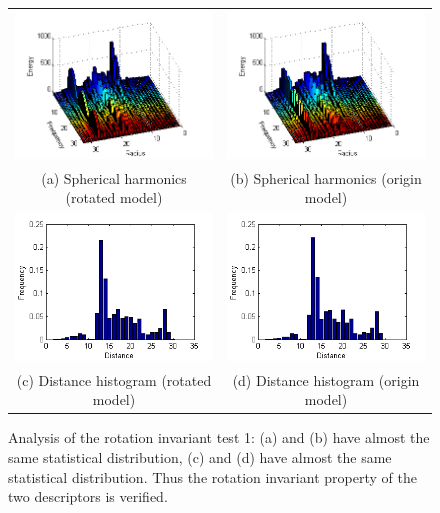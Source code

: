 \begin{figure}
\begin{center}
\begin{tabular}{cc}   %
   \includegraphics[width=0.45\linewidth]{rotationinvariant_test_SH10_rotated} & 
   \includegraphics[width=0.45\linewidth]{rotationinvariant_test_SH10_origin}  \\
   (a) Spherical harmonics (rotated model) & (b) Spherical harmonics (origin model) \\
   \includegraphics[width=0.45\linewidth]{rotationinvariant_test_DH10_rotated} &
   \includegraphics[width=0.45\linewidth]{rotationinvariant_test_DH10_origin}  \\
   (c) Distance histogram (rotated model) & (d) Distance histogram (origin model)\\
\end{tabular}
\caption{Analysis of the rotation invariant test 1: (a) and (b) have almost the same statistical distribution, (c) and (d) have almost the same statistical distribution. Thus the rotation invariant property of the two descriptors is verified.} 
  \label{rotationinvarianttest_analysis1}
\end{center}
\end{figure}

